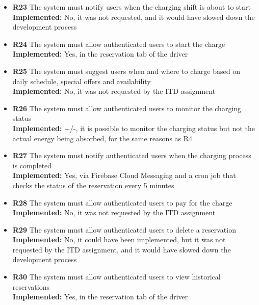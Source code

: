 \begin{itemize}
      \item        \textbf{R23} The system must notify users when the charging shift is about to start                                            \\
            \textbf{Implemented:} No, it was not requested, and it would have slowed down the development process
      \item        \textbf{R24} The system must allow authenticated users to start the charge                                                     \\
            \textbf{Implemented:} Yes, in the reservation tab of the driver
      \item        \textbf{R25} The system must suggest users when and where to charge based on daily schedule, special offers and availability   \\
            \textbf{Implemented:} No, it was not requested by the ITD assignment
      \item        \textbf{R26} The system must allow authenticated users to monitor the charging status                                          \\
            \textbf{Implemented:} +/-, it is possible to monitor the charging status but not the actual energy being absorbed, for the same reasons as R4
      \item        \textbf{R27} The system must notify authenticated users when the charging process is completed                                 \\
            \textbf{Implemented:} Yes, via Firebase Cloud Messaging and a cron job that checks the status of the reservation every 5 minutes
      \item        \textbf{R28} The system must allow authenticated users to pay for the charge                                                   \\
            \textbf{Implemented:} No, it was not requested by the ITD assignment
      \item        \textbf{R29} The system must allow authenticated users to delete a reservation                                                 \\
            \textbf{Implemented:} No, it could have been implemented, but it was not requested by the ITD assignment, and it would have slowed down the development process
      \item        \textbf{R30} The system must allow authenticated users to view historical reservations                                         \\
            \textbf{Implemented:} Yes, in the reservation tab of the driver
\end{itemize}